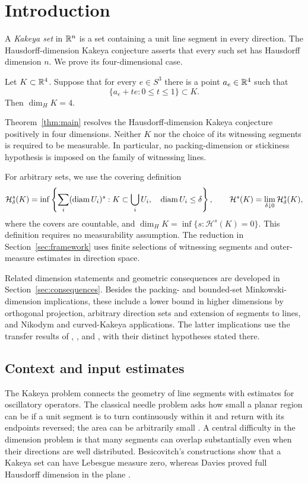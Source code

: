 \section{Introduction}\label{sec:introduction}

A \emph{Kakeya set} in \(\mathbb R^n\) is a set containing a unit line segment
in every direction. The Hausdorff-dimension Kakeya conjecture asserts
that every such set has Hausdorff dimension \(n\). We prove its
four-dimensional case.

\begin{theorem}\label{thm:main}
Let \(K\subset\mathbb R^4\). Suppose that for every \(e\in S^3\) there is a point
\(a_e\in\mathbb R^4\) such that
\[
  \{a_e+te:0\leq t\leq1\}\subset K.
\]
Then \(\dim_H K=4\).
\end{theorem}

Theorem~\ref{thm:main} resolves the Hausdorff-dimension Kakeya conjecture
positively in four dimensions. Neither \(K\) nor the choice of its
witnessing segments is required to be measurable. In particular, no
packing-dimension or stickiness hypothesis is imposed on the family
of witnessing lines.

For arbitrary sets, we use the covering definition
\[
 \mathcal H_\delta^s(K)
 =\inf\left\{\sum_i(\operatorname{diam} U_i)^s:
        K\subset\bigcup_i U_i,\quad \operatorname{diam} U_i\leq\delta\right\},
 \qquad
 \mathcal H^s(K)=\lim_{\delta\downarrow0}\mathcal H_\delta^s(K),
\]
where the covers are countable, and
\(\dim_H K=\inf\{s:\mathcal H^s(K)=0\}\).
This definition requires no measurability assumption. The reduction
in Section~\ref{sec:framework} uses finite selections of witnessing
segments and outer-measure estimates in direction space.

Related dimension statements and geometric consequences are developed
in Section~\ref{sec:consequences}. Besides the packing- and
bounded-set Minkowski-dimension implications, these include a lower
bound in higher dimensions by orthogonal projection, arbitrary
direction sets and extension of segments to lines, and Nikodym and
curved-Kakeya applications. The latter implications use the transfer
results of \citet{KeletiMatheEquivalences},
\citet{GaoLiuXi2025}, and \citet{NadjimzadahLifting}, with their
distinct hypotheses stated there.

\subsection{Context and input estimates}

The Kakeya problem connects the geometry of line segments with
estimates for oscillatory operators. The classical needle problem
asks how small a planar region can be if a unit segment is to turn
continuously within it and return with its endpoints reversed; the
area can be arbitrarily small \citep{Besicovitch1928,Davies1971}.
A central difficulty in the dimension problem is that many segments
can overlap substantially even when their directions are well
distributed. Besicovitch's constructions show that a Kakeya set can
have Lebesgue measure zero, whereas Davies proved full Hausdorff
dimension in the plane \citep{Besicovitch1928,Davies1971}.


